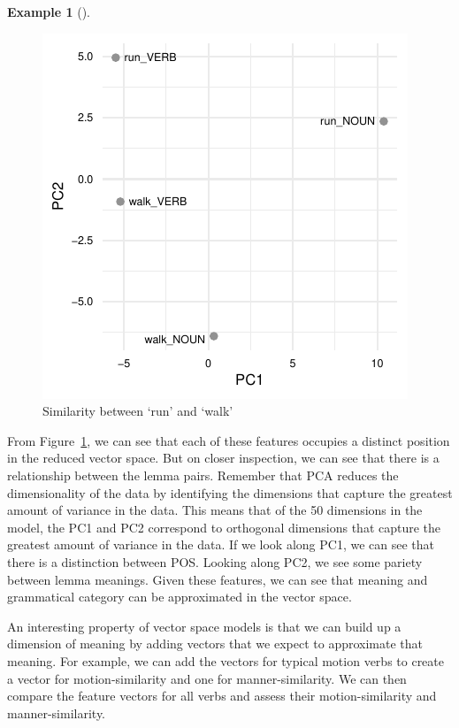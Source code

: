 \documentclass[
  letterpaper,
  krantz1]{latex/krantz-mod}
\theoremstyle{definition}
\newtheorem{example}{Example}[chapter]
\theoremstyle{definition}
\theoremstyle{remark}
\begin{document}
\begin{example}[]
\begin{figure}[!htb]
{\includegraphics{part_4/8_explore_files/figure-pdf/fig-explore-masc-vsm-word2vec-similarity-1.pdf}

}

\caption{\label{fig-explore-masc-vsm-word2vec-similarity}Similarity
between `run' and `walk'}

\end{figure}%

\end{example}

From Figure~\ref{fig-explore-masc-vsm-word2vec-similarity}, we can see
that each of these features occupies a distinct position in the reduced
vector space. But on closer inspection, we can see that there is a
relationship between the lemma pairs. Remember that PCA reduces the
dimensionality of the data by identifying the dimensions that capture
the greatest amount of variance in the data. This means that of the 50
dimensions in the model, the PC1 and PC2 correspond to orthogonal
dimensions that capture the greatest amount of variance in the data. If
we look along PC1, we can see that there is a distinction between POS.
Looking along PC2, we see some pariety between lemma meanings. Given
these features, we can see that meaning and grammatical category can be
approximated in the vector space.

An interesting property of vector space models is that we can build up a
dimension of meaning by adding vectors that we expect to approximate
that meaning. For example, we can add the vectors for typical motion
verbs to create a vector for motion-similarity and one for
manner-similarity. We can then compare the feature vectors for all verbs
and assess their motion-similarity and manner-similarity.
\end{document}
